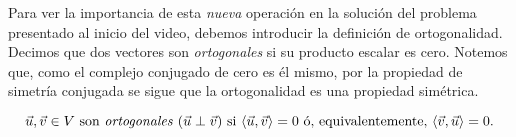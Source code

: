 \documentclass[12pt,dvipsnames]{article}
\numberwithin{equation}{section}
\begin{document}
%

Para ver la importancia de esta \emph{nueva} operación en la solución del problema presentado al inicio del video, debemos introducir la definición de ortogonalidad. Decimos que dos vectores son \emph{ortogonales} si su producto escalar es cero. Notemos que, como el complejo conjugado de cero es él mismo, por la propiedad de simetría conjugada se sigue que la ortogonalidad es una propiedad simétrica.

\[
    \vec{u},\vec{v}\in V \ \text{son \emph{ortogonales}} \ (\vec{u}\perp\vec{v}) \ \text{si} \ \langle \vec{u} , \vec{v} \rangle = 0 \ \text{ó, equivalentemente,} \ \langle \vec{v} , \vec{u} \rangle = 0.
\] 
\end{document}

